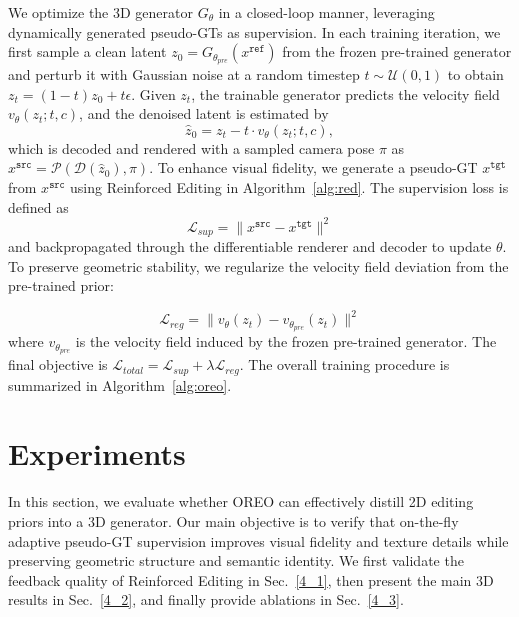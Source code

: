 \documentclass[runningheads]{llncs}
\begin{document}
We optimize the 3D generator $G_\theta$ in a closed-loop manner, leveraging dynamically generated pseudo-GTs as supervision.
In each training iteration, we first sample a clean latent $z_0 = G_{\theta_{pre}}(x^{\texttt{ref}})$ from the frozen pre-trained generator and perturb it with Gaussian noise at a random timestep $t \sim \mathcal{U}(0,1)$ to obtain $z_t = (1-t)z_0 + t\epsilon$.
Given $z_t$, the trainable generator predicts the velocity field $v_\theta(z_t; t, c)$, and the denoised latent is estimated by
\begin{equation}
\hat{z}_0 = z_t - t \cdot v_\theta(z_t; t, c),
\end{equation}
which is decoded and rendered with a sampled camera pose $\pi$ as $x^{\texttt{src}} = \mathcal{P}(\mathcal{D}(\hat{z}_0), \pi)$.
To enhance visual fidelity, we generate a pseudo-GT $x^{\texttt{tgt}}$ from $x^{\texttt{src}}$ using Reinforced Editing in Algorithm~\ref{alg:red}.
The supervision loss is defined as
\begin{equation}
\mathcal{L}_{sup} = \| x^{\texttt{src}} - x^{\texttt{tgt}} \|^2
\end{equation}
and backpropagated through the differentiable renderer and decoder to update $\theta$.
To preserve geometric stability, we regularize the velocity field deviation from the pre-trained prior:

\begin{equation}
\mathcal{L}_{reg} = \| v_\theta(z_t) - v_{\theta_{pre}}(z_t) \|^2
\end{equation}
where $v_{\theta_{pre}}$ is the velocity field induced by the frozen pre-trained generator.
The final objective is $\mathcal{L}_{total} = \mathcal{L}_{sup} + \lambda \mathcal{L}_{reg}$.
The overall training procedure is summarized in Algorithm~\ref{alg:oreo}.


\section{Experiments}
\label{sec:experiments}


In this section, we evaluate whether OREO can effectively distill 2D editing priors into a 3D generator.
Our main objective is to verify that on-the-fly adaptive pseudo-GT supervision improves visual fidelity and texture details while preserving geometric structure and semantic identity.
We first validate the feedback quality of Reinforced Editing in Sec.~\ref{4_1}, then present the main 3D results in Sec.~\ref{4_2}, and finally provide ablations in Sec.~\ref{4_3}.
\end{document}
